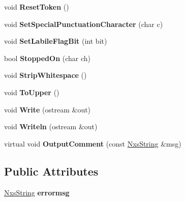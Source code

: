 \begin{DoxyCompactItemize}
\item 
\hypertarget{classNxsToken_afd330ed87b253864f10dd8c4282d824d}{
void {\bfseries ResetToken} ()}
\label{classNxsToken_afd330ed87b253864f10dd8c4282d824d}

\item 
\hypertarget{classNxsToken_ad6e4423d22411f5779f2043f22008256}{
void {\bfseries SetSpecialPunctuationCharacter} (char c)}
\label{classNxsToken_ad6e4423d22411f5779f2043f22008256}

\item 
\hypertarget{classNxsToken_afa5232738ca19e069173e8befe75e730}{
void {\bfseries SetLabileFlagBit} (int bit)}
\label{classNxsToken_afa5232738ca19e069173e8befe75e730}

\item 
\hypertarget{classNxsToken_a866fd0156710932ff8cc9aeeccde3fa6}{
bool {\bfseries StoppedOn} (char ch)}
\label{classNxsToken_a866fd0156710932ff8cc9aeeccde3fa6}

\item 
\hypertarget{classNxsToken_a1c6fa60bd11ed8df496ea30083005532}{
void {\bfseries StripWhitespace} ()}
\label{classNxsToken_a1c6fa60bd11ed8df496ea30083005532}

\item 
\hypertarget{classNxsToken_a19a122c7b27d6cda65034acee1d61d01}{
void {\bfseries ToUpper} ()}
\label{classNxsToken_a19a122c7b27d6cda65034acee1d61d01}

\item 
\hypertarget{classNxsToken_a0ae503db53d3e2ec1e194505575e9721}{
void {\bfseries Write} (ostream \&out)}
\label{classNxsToken_a0ae503db53d3e2ec1e194505575e9721}

\item 
\hypertarget{classNxsToken_afb060151230ba6d764dd894f5e50b075}{
void {\bfseries Writeln} (ostream \&out)}
\label{classNxsToken_afb060151230ba6d764dd894f5e50b075}

\item 
\hypertarget{classNxsToken_a8bcc10cb8b852257dc0449491e74cbff}{
virtual void {\bfseries OutputComment} (const \hyperlink{classNxsString}{NxsString} \&msg)}
\label{classNxsToken_a8bcc10cb8b852257dc0449491e74cbff}

\end{DoxyCompactItemize}
\subsection*{Public Attributes}
\begin{DoxyCompactItemize}
\item 
\hypertarget{classNxsToken_a30b21153e170902dbfd8554a10c982ea}{
\hyperlink{classNxsString}{NxsString} {\bfseries errormsg}}
\label{classNxsToken_a30b21153e170902dbfd8554a10c982ea}

\end{DoxyCompactItemize}

